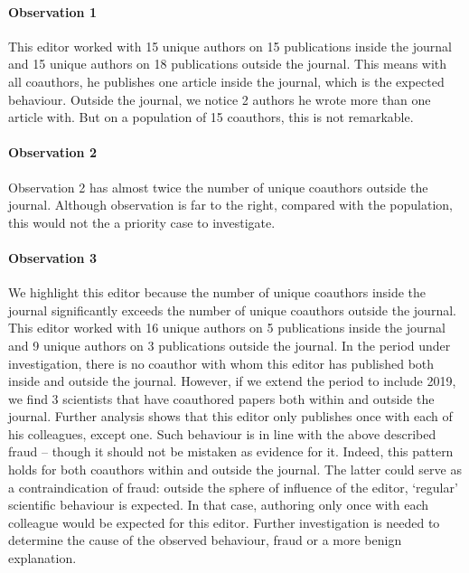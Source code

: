\documentclass{ou-report}
\begin{document}
\paragraph{Observation 1}
This editor worked with 15 unique authors on 15 publications inside the journal 
and 15 unique authors on 18 publications outside the journal.
This means with all coauthors, he publishes one article inside the journal,
which is the expected behaviour.
Outside the journal, we notice 2 authors he wrote more than one article with. 
But on a population of 15 coauthors, this is not remarkable.

\paragraph{Observation 2}
Observation 2 has almost twice the number of unique coauthors outside the 
journal. Although observation is far to the right, compared with the 
population, this would not the a priority case to investigate.

\paragraph{Observation 3}
We highlight this editor because the number of unique coauthors 
inside the journal significantly exceeds the number of unique coauthors outside 
the journal. 
This editor worked with 16 unique authors on 5 publications inside the journal 
and 9 unique authors on 3 publications outside the journal. In the period under
investigation, there is no coauthor with whom this editor has published both
inside and outside the journal. However, if we extend  the period to include
2019, we find 3 scientists that have coauthored papers both within and outside
the journal. Further analysis shows that this editor only publishes once with
each of his colleagues, except one. Such behaviour is in line with the above
described fraud  -- though it should not be mistaken as evidence for it. Indeed,
this pattern holds for both coauthors within and outside the journal. The latter
could serve as a contraindication of fraud: outside the sphere of influence of
the editor, `regular' scientific behaviour is expected. In that case, authoring
only once with each colleague would be expected for this editor. Further
investigation is needed to determine the cause of the observed behaviour, fraud
or a more benign explanation.
\end{document}
